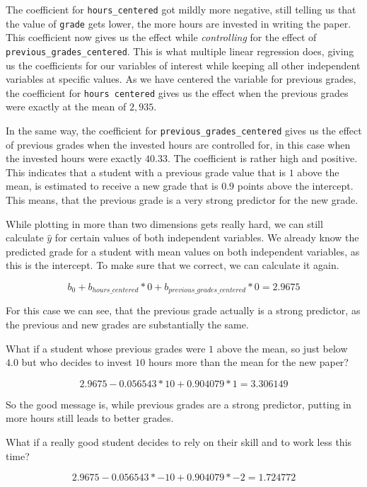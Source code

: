 \documentclass[
]{book}
\begin{document}
The coefficient for \texttt{hours\_centered} got mildly more negative, still telling us
that the value of \texttt{grade} gets lower, the more hours are invested in writing the
paper. This coefficient now gives us the effect while \emph{controlling} for the
effect of \texttt{previous\_grades\_centered}. This is what multiple linear regression
does, giving us the coefficients for our variables of interest while keeping all
other independent variables at specific values. As we have centered the variable
for previous grades, the coefficient for \texttt{hours\ centered} gives us the effect
when the previous grades were exactly at the mean of \(2,935\).

In the same way, the coefficient for \texttt{previous\_grades\_centered} gives us the
effect of previous grades when the invested hours are controlled for, in this
case when the invested hours were exactly \(40.33\). The coefficient is rather
high and positive. This indicates that a student with a previous grade value
that is \(1\) above the mean, is estimated to receive a new grade that is \(0.9\)
points above the intercept. This means, that the previous grade is a very strong
predictor for the new grade.

While plotting in more than two dimensions gets really hard, we can still
calculate \(\hat{y}\) for certain values of both independent variables.
We already know the predicted grade for a student with mean values on both
independent variables, as this is the intercept. To make sure that we correct,
we can calculate it again.

\[b_0 + b_{hours\_centered}*0 + b_{previous\_grades\_centered}*0 = 2.9675\]

For this case we can see, that the previous grade actually is a strong
predictor, as the previous and new grades are substantially the same.

What if a student whose previous grades were \(1\) above the mean, so just below
\(4.0\) but who decides to invest \(10\) hours more than the mean for the new paper?

\[2.9675 - 0.056543 * 10 + 0.904079 * 1 = 3.306149\]

So the good message is, while previous grades are a strong predictor, putting in
more hours still leads to better grades.

What if a really good student decides to rely on their skill and to work less
this time?

\[2.9675 - 0.056543 * -10 + 0.904079 * -2 = 1.724772\]
\end{document}
